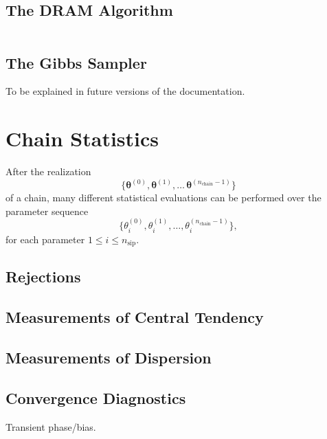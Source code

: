 \subsection{The DRAM Algorithm}%
$~$\\

\subsection{The Gibbs Sampler}

To be explained in future versions of the documentation.

\section{Chain Statistics}\label{sc-rmc-chain-stats}

After the realization
\begin{equation}\label{eq-markov-chain-2}
\{\boldsymbol{\theta}^{(0)},\boldsymbol{\theta}^{(1)},\ldots\,\boldsymbol{\theta}^{(n_{\text{chain}}-1)}\}
\end{equation}
of a chain,
many different statistical evaluations can be performed over the parameter sequence
\begin{equation}\label{eq-markov-chains-for-each-specific-parameter}
\{{\theta}_i^{(0)},{\theta}_i^{(1)},\ldots,{\theta}_i^{(n_{\text{chain}}-1)}\},
\end{equation}
for each parameter $1\leqslant i\leqslant n_{\text{sip}}$.

\subsection{Rejections}

\subsection{Measurements of Central Tendency}

\subsection{Measurements of Dispersion}

\subsection{Convergence Diagnostics}

Transient phase/bias.

